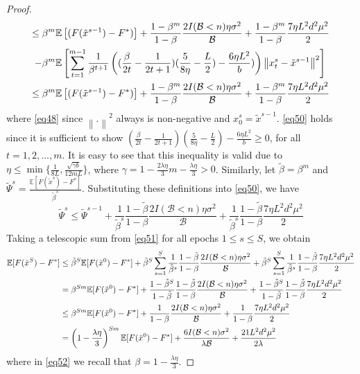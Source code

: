 \documentclass[iicol,sn-basic]{sn-jnl}
\theoremstyle{thmstyleone}%
\theoremstyle{thmstyletwo}%
\theoremstyle{thmstylethree}%
\newcommand*{\E}{\mathbb{E}}
\newcommand{\norm}[1]{\left\lVert#1\right\rVert}
\begin{document}
\begin{proof}
\begin{align}
\leq\beta^m\E&\left[(F(\tilde{x}^{s-1}) - F^*)\right] + \frac{1-\beta^m}{1-\beta}\frac{2I(\mathcal{B} < n)\eta \sigma ^2}{\mathcal{B}}+\frac{1-\beta^m}{1-\beta}\frac{7 \eta L^2 d^2 \mu^2}{2}\notag
\\-\beta^m\E&\left[\sum_{t=1}^{m-1}\frac{1}{\beta^{t+1}}\left((\frac{\beta}{2t} - \frac{1}{2t+1})(\frac{5}{8\eta} - \frac{L}{2})-\frac{6 \eta L^2}{b})\right) \norm{x_{t}^s-\tilde{x}^{s-1}}^2 \right]\notag\\
\leq\beta^m\E&\left[(F(\tilde{x}^{s-1}) - F^*)\right] + \frac{1-\beta^m}{1-\beta}\frac{2I(\mathcal{B} < n)\eta \sigma ^2}{\mathcal{B}}+\frac{1-\beta^m}{1-\beta}\frac{7 \eta L^2 d^2 \mu^2}{2}\label{eq50}
\end{align}
where \eqref{eq48} since $\norm{.}^2$ always is non-negative and $x_0^s=\tilde{x}^{s-1}$. \eqref{eq50} holds since it is sufficient to show $(\frac{\beta}{2t} - \frac{1}{2t+1})(\frac{5}{8\eta} - \frac{L}{2})- \frac{6\eta L^2}{b} \geq 0$, for all $t=1, 2,\ldots, m$. 
It is easy to see that this inequality is valid due to $\eta \leq \min\{\frac{1}{8L}, \frac{\sqrt{\gamma b}}{12 m L }\}$, where $\gamma = 1-\frac{2\lambda\eta}{3} m-\frac{\lambda\eta}{3} > 0$. Similarly, let  $\tilde{\beta} = \beta^m$ and $\tilde{\Psi}^s = \frac{\E[F(\tilde{x}^{s})-F^*]}{\tilde{\beta}^s}$. Substituting these definitions into \eqref{eq50}, we have
\begin{equation}\label{eq51}
\tilde{\Psi}^s \leq \tilde{\Psi}^{s-1} + \frac{1}{\tilde{\beta}^s} \frac{1-\tilde{\beta}}{1-{\beta}}\frac{2 I(\mathcal{B} < n)\eta \sigma ^2}{\mathcal{B}}+ \frac{1}{\tilde{\beta}^s} \frac{1-\tilde{\beta}}{1-{\beta}}\frac{7\eta L^2 d^2 \mu^2}{2}
\end{equation}
Taking a telescopic sum from \eqref{eq51} for all epochs $1 \leq s \leq S$, we obtain
\begin{align}
\E[F(\tilde{x}^S) - {F}^*] & \leq \tilde{\beta}^{S} \E[F(\tilde{x}^0) - {F}^*] + \tilde{\beta}^{S} \sum_{s=1}^S \frac{1}{\tilde{\beta}^s}\frac{1-\tilde{\beta}}{1-{\beta}}\frac{2I(\mathcal{B} < n)\eta \sigma ^2}{\mathcal{B}} + \tilde{\beta}^{S} \sum_{s=1}^S \frac{1}{\tilde{\beta}^s}\frac{1-\tilde{\beta}}{1-{\beta}}\frac{7 \eta L^2 d^2 \mu^2}{2}\notag\\
& = {\beta}^{Sm} \E[F(\tilde{x}^0) - {F}^*] + \frac{1-\tilde{\beta}^S}{1-\tilde{\beta}}\frac{1-\tilde{\beta}}{1-{\beta}}\frac{2I(\mathcal{B} < n)\eta \sigma ^2}{\mathcal{B}}+ \frac{1-\tilde{\beta}^S}{1-\tilde{\beta}}\frac{1-\tilde{\beta}}{1-{\beta}}\frac{7 \eta L^2 d^2 \mu^2}{2}\notag\\
& \leq {\beta}^{Sm} \E[F(\tilde{x}^0) - {F}^*] + \frac{1}{1-{\beta}}\frac{2 I(\mathcal{B} < n)\eta \sigma ^2}{\mathcal{B}}+ \frac{1}{1-{\beta}}\frac{7 \eta L^2 d^2 \mu^2}{2}\notag\\
& = \left(1-\frac{\lambda\eta}{3}\right)^{Sm} \E[F(\tilde{x}^0) - {F}^*] + \frac{6I(\mathcal{B} < n) \sigma ^2}{\lambda\mathcal{B}}+\frac{21 L^2 d^2 \mu^2}{2\lambda}\label{eq52}
\end{align}
where in \eqref{eq52} we recall that $\beta = 1-\frac{\lambda\eta}{3}$.
\end{proof}
\end{document}
